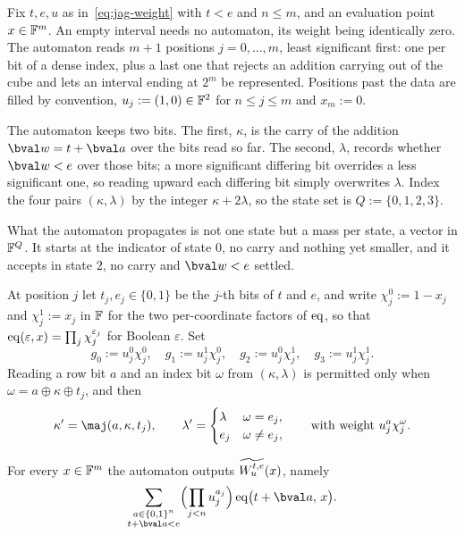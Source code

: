 Fix $t,e,u$ as in~\eqref{eq:jag-weight} with $t<e$ and $n\le m$, and an evaluation point $x\in\mathbb{F}^m$. An empty interval needs no automaton, its weight being identically zero. The automaton reads $m+1$ positions $j=0,\dots,m$, least significant first: one per bit of a dense index, plus a last one that rejects an addition carrying out of the cube and lets an interval ending at $2^m$ be represented. Positions past the data are filled by convention, $u_j:=(1,0)\in\mathbb{F}^2$ for $n\le j\le m$ and $x_m:=0$.

The automaton keeps two bits. The first, $\kappa$, is the carry of the addition $\bval w=t+\bval a$ over the bits read so far. The second, $\lambda$, records whether $\bval w<e$ over those bits; a more significant differing bit overrides a less significant one, so reading upward each differing bit simply overwrites $\lambda$. Index the four pairs $(\kappa,\lambda)$ by the integer $\kappa+2\lambda$, so the state set is $Q:=\{0,1,2,3\}$.

What the automaton propagates is not one state but a mass per state, a vector in $\mathbb{F}^Q$. It starts at the indicator of state $0$, no carry and nothing yet smaller, and it accepts in state $2$, no carry and $\bval w<e$ settled.

At position $j$ let $t_j,e_j\in\{0,1\}$ be the $j$-th bits of $t$ and $e$, and write $\chi_j^0:=1-x_j$ and $\chi_j^1:=x_j$ in $\mathbb{F}$ for the two per-coordinate factors of $\operatorname{eq}$, so that $\operatorname{eq}(\varepsilon,x)=\prod_j\chi_j^{\varepsilon_j}$ for Boolean $\varepsilon$. Set
\[
  g_0:=u_j^0\chi_j^0,\quad g_1:=u_j^1\chi_j^0,\quad g_2:=u_j^0\chi_j^1,\quad g_3:=u_j^1\chi_j^1 .
\]
Reading a row bit $a$ and an index bit $\omega$ from $(\kappa,\lambda)$ is permitted only when $\omega=a\oplus\kappa\oplus t_j$, and then
\[
  \kappa'=\maj(a,\kappa,t_j),\qquad
  \lambda'=\begin{cases}\lambda & \omega=e_j,\\ e_j & \omega\neq e_j,\end{cases}
  \qquad\text{with weight } u_j^a\chi_j^{\omega}.
\]

\begin{lemma}\label{lem:jag-automaton}
For every $x\in\mathbb{F}^m$ the automaton outputs $\widetilde{W^{t,e}_u}(x)$, namely
\[
  \sum_{\substack{a\in\cube n\\ t+\bval a<e}}\Bigl(\prod_{j<n}u_j^{a_j}\Bigr)\eq\bigl(t+\bval a,\,x\bigr).
\]
\end{lemma}

